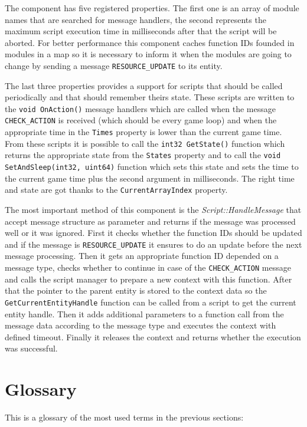 The component has five registered properties. The first one is an array of module names that are searched for message handlers, the second represents the maximum script execution time in milliseconds after that the script will be aborted. For better performance this component caches function IDs founded in modules in a map so it is necessary to inform it when the modules are going to change by sending a message \verb/RESOURCE_UPDATE/ to its entity.

The last three properties provides a support for scripts that should be called periodically and that should remember theirs state. These scripts are written to the \verb/void OnAction()/ message handlers which are called when the message \verb/CHECK_ACTION/ is received (which should be every game loop) and when the appropriate time in the \verb/Times/ property is lower than the current game time. From these scripts it is possible to call the \verb/int32 GetState()/ function which returns the appropriate state from the \verb/States/ property and to call the \verb/void SetAndSleep(int32, uint64)/ function which sets this state and sets the time to the current game time plus the second argument in milliseconds. The right time and state are got thanks to the \verb/CurrentArrayIndex/ property.

The most important method of this component is the \emph{Script::Handle\-Me\-ssa\-ge} that accept message structure as parameter and returns if the message was processed well or it was ignored. First it checks whether the function IDs should be updated and if the message is \verb/RESOURCE_UPDATE/ it ensures to do an update before the next message processing. Then it gets an appropriate function ID depended on a message type, checks whether to continue in case of the \verb/CHECK_ACTION/ message and calls the script manager to prepare a new context with this function. After that the pointer to the parent entity is stored to the context data so the \verb/GetCurrentEntityHandle/ function can be called from a script to get the current entity handle. Then it adds additional parameters to a function call from the message data according to the message type and executes the context with defined timeout. Finally it releases the context and returns whether the execution was successful.

\section{Glossary}

This is a glossary of the most used terms in the previous sections:

